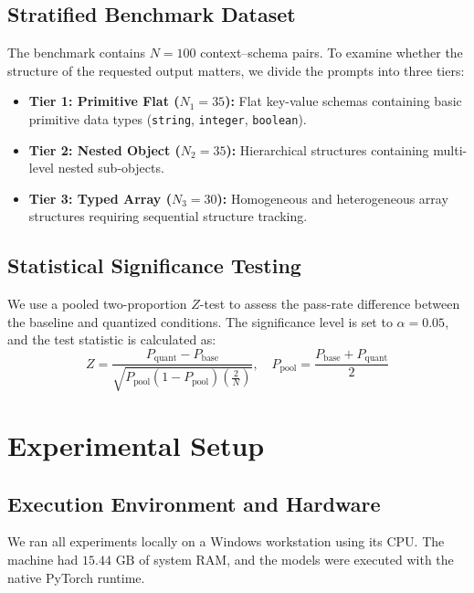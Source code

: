 \documentclass[10pt, conference, a4paper]{IEEEtran}
\begin{document}
\subsection{Stratified Benchmark Dataset}
The benchmark contains $N=100$ context--schema pairs. To examine whether the structure of the requested output matters, we divide the prompts into three tiers:
\begin{itemize}
    \item \textbf{Tier 1: Primitive Flat ($N_1 = 35$):} Flat key-value schemas containing basic primitive data types (\texttt{string}, \texttt{integer}, \texttt{boolean}).
    \item \textbf{Tier 2: Nested Object ($N_2 = 35$):} Hierarchical structures containing multi-level nested sub-objects.
    \item \textbf{Tier 3: Typed Array ($N_3 = 30$):} Homogeneous and heterogeneous array structures requiring sequential structure tracking.
\end{itemize}

\subsection{Statistical Significance Testing}
We use a pooled two-proportion $Z$-test to assess the pass-rate difference between the baseline and quantized conditions. The significance level is set to $\alpha = 0.05$, and the test statistic is calculated as:
\begin{equation}
Z = \frac{P_{\text{quant}} - P_{\text{base}}}{\sqrt{P_{\text{pool}}(1 - P_{\text{pool}})\left(\frac{2}{N}\right)}}, \quad P_{\text{pool}} = \frac{P_{\text{base}} + P_{\text{quant}}}{2}
\end{equation}

\section{Experimental Setup}

\subsection{Execution Environment and Hardware}
We ran all experiments locally on a Windows workstation using its CPU. The machine had $15.44\text{ GB}$ of system RAM, and the models were executed with the native PyTorch runtime.
\end{document}
